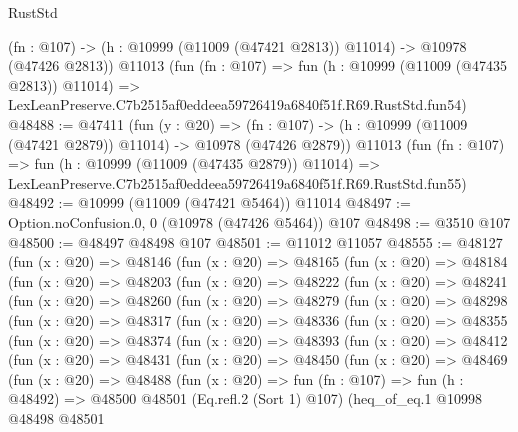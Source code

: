 \begin{lexlean}{RustStd}
\begin{coremodule}
    (fn : @107) -> (h : @10999 (@11009 (@47421 @2813)) @11014) -> @10978 (@47426 @2813))
    @11013
    (fun (fn : @107) =>
    fun (h : @10999 (@11009 (@47435 @2813)) @11014) =>
    LexLeanPreserve.C7b2515af0eddeea59726419a6840f51f.R69.RustStd.fun54)
@48488 := @47411
    (fun (y : @20) =>
    (fn : @107) -> (h : @10999 (@11009 (@47421 @2879)) @11014) -> @10978 (@47426 @2879))
    @11013
    (fun (fn : @107) =>
    fun (h : @10999 (@11009 (@47435 @2879)) @11014) =>
    LexLeanPreserve.C7b2515af0eddeea59726419a6840f51f.R69.RustStd.fun55)
@48492 := @10999 (@11009 (@47421 @5464)) @11014
@48497 := Option.noConfusion.{0, 0} (@10978 (@47426 @5464)) @107
@48498 := @3510 @107
@48500 := @48497 @48498 @107
@48501 := @11012 @11057
@48555 := @48127
    (fun (x : @20) =>
    @48146
      (fun (x : @20) =>
      @48165
        (fun (x : @20) =>
        @48184
          (fun (x : @20) =>
          @48203
            (fun (x : @20) =>
            @48222
              (fun (x : @20) =>
              @48241
                (fun (x : @20) =>
                @48260
                  (fun (x : @20) =>
                  @48279
                    (fun (x : @20) =>
                    @48298
                      (fun (x : @20) =>
                      @48317
                        (fun (x : @20) =>
                        @48336
                          (fun (x : @20) =>
                          @48355
                            (fun (x : @20) =>
                            @48374
                              (fun (x : @20) =>
                              @48393
                                (fun (x : @20) =>
                                @48412
                                  (fun (x : @20) =>
                                  @48431
                                    (fun (x : @20) =>
                                    @48450
                                      (fun (x : @20) =>
                                      @48469
                                        (fun (x : @20) =>
                                        @48488
                                          (fun (x : @20) =>
                                          fun (fn : @107) =>
                                          fun (h : @48492) =>
                                          @48500
                                            @48501
                                            (Eq.refl.{2} (Sort 1) @107)
                                            (heq_of_eq.{1}
                                              @10998
                                              @48498
                                              @48501

\end{coremodule}
\end{lexlean}
